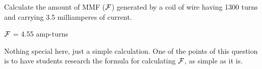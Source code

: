 

Calculate the amount of MMF ($\cal F$) generated by a coil of wire having 1300 turns and carrying 3.5 milliamperes of current.







$\cal F$ = 4.55 amp-turns







Nothing special here, just a simple calculation.  One of the points of this question is to have students research the formula for calculating $\cal F$, as simple as it is.




